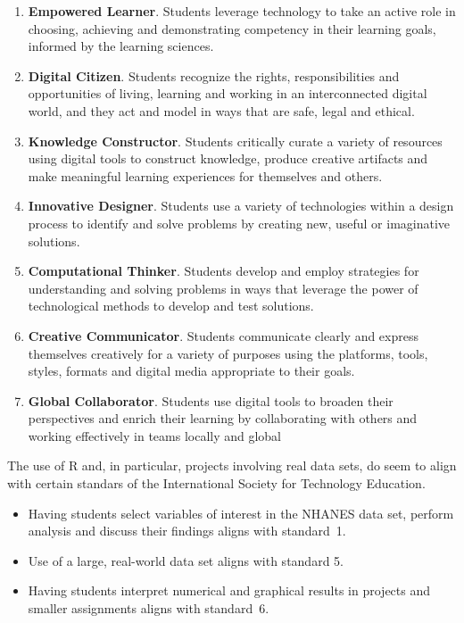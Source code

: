 \documentclass[10pt]{article}
\begin{document}
\begin{enumerate}
\item \textbf{Empowered Learner}. Students leverage technology to take an active role in choosing, achieving and demonstrating competency in their learning goals, informed by the learning sciences.
\item 
\textbf{Digital Citizen}. Students recognize the rights, responsibilities and opportunities of living, learning and working in an interconnected digital world, and they act and model in ways that are safe, legal and ethical.
\item 
  \textbf{Knowledge Constructor}.
  Students critically curate a variety of resources using digital tools to construct knowledge, produce creative artifacts and make meaningful learning experiences for themselves and others.
\item 
\textbf{Innovative Designer}.
Students use a variety of technologies within a design process to identify and solve problems by creating new, useful or imaginative solutions.
\item 
\textbf{Computational Thinker}.
Students develop and employ strategies for understanding and solving problems in ways that leverage the power of technological methods to develop and test solutions.
\item 
\textbf{Creative Communicator}.
Students communicate clearly and express themselves creatively for a variety of purposes using the platforms, tools, styles, formats and digital media appropriate to their goals.
\item 
\textbf{Global Collaborator}.
Students use digital tools to broaden their perspectives and enrich their learning by collaborating with others and working effectively in teams locally and global
\end{enumerate}
\bigskip

The use of R and, in particular, projects involving real data sets, do seem to 
align with certain standars of the International Society for Technology Education.

\begin{itemize}
\item Having students select variables of interest in the NHANES data set, perform
analysis  and discuss their findings aligns with standard~1.
\item Use of a large, real-world data set aligns with standard 5.
\item Having students interpret numerical and graphical results in projects and 
  smaller assignments aligns with standard~6.
\end{itemize}

\vfill
\eject
\end{document}
